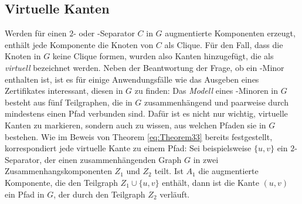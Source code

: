 \subsection{Virtuelle Kanten}
Werden für einen $2$- oder \dd-Separator $C$ in $G$ augmentierte Komponenten erzeugt, enthält jede Komponente die Knoten von $C$ als Clique.
Für den Fall, dass die Knoten in $G$ keine Clique formen, wurden also Kanten hinzugefügt, die als \emph{virtuell} bezeichnet werden.
Neben der Beantwortung der Frage, ob ein \kf-Minor enthalten ist, ist es für einige Anwendungsfälle wie das Ausgeben eines Zertifikates interessant, diesen in $G$ zu finden:
Das \emph{Modell} eines \kf-Minoren in $G$ besteht aus fünf Teilgraphen, die in $G$ zusammenhängend und paarweise durch mindestens einen Pfad verbunden sind.
Dafür ist es nicht nur wichtig, virtuelle Kanten zu markieren, sondern auch zu wissen, aus welchen Pfaden sie in $G$ bestehen.
Wie im Beweis von Theorem \ref{eq:Theorem33} bereits festgestellt, korrespondiert jede virtuelle Kante zu einem Pfad:
Sei beispielsweise $\{u, v\}$ ein $2$-Separator, der einen zusammenhängenden Graph $G$ in zwei Zusammenhangskomponenten $Z_1$ und $Z_2$ teilt.
Ist $A_1$ die augmentierte Komponente, die den Teilgraph $Z_1 \cup \{u, v\}$ enthält, dann ist die Kante $(u, v)$ ein Pfad in $G$, der durch den Teilgraph $Z_2$ verläuft.

